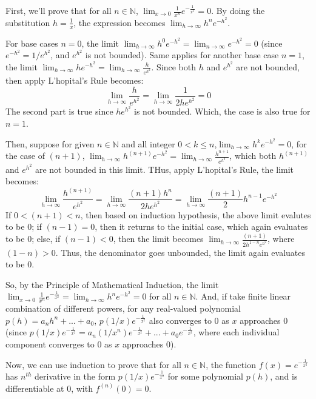 \documentclass{article}
\begin{document}
First, we'll prove that for all $n\in\mathbb{N}$, $\lim_{x\rightarrow 0}\frac{1}{x^n}e^{-\frac{1}{x^2}}=0$.
By doing the substitution $h=\frac{1}{x}$, the expression becomes $\lim_{h\rightarrow\infty}h^ne^{-h^2}$.

For base cases $n=0$, the limit $\lim_{h\rightarrow \infty}h^0e^{-h^2} = \lim_{n\rightarrow\infty}e^{-h^2}=0$ (since $e^{-h^2}=1/e^{h^2}$, and $e^{h^2}$ is not bounded).
Same applies for another base case $n=1$, the limit $\lim_{h\rightarrow\infty}he^{-h^2} = \lim_{h\rightarrow\infty}\frac{h}{e^{h^2}}$. Since both $h$ and $e^{h^2}$ are not bounded, 
then apply L'hopital's Rule becomes:
$$\lim_{h\rightarrow\infty}\frac{h}{e^{h^2}}=\lim_{h\rightarrow\infty}\frac{1}{2he^{h^2}}=0$$
The second part is true since $he^{h^2}$ is not bounded. Which, the case is also true for $n=1$.

\hfill

Then, suppose for given $n\in\mathbb{N}$ and all integer $0< k\leq n$,$\lim_{h\rightarrow\infty}h^ke^{-h^2}=0$, for the case of $(n+1)$,
$\lim_{h\rightarrow\infty}h^{(n+1)}e^{-h^2}=\lim_{h\rightarrow\infty}\frac{h^{n+1}}{e^{h^2}}$, which both $h^{(n+1)}$ and $e^{h^2}$ are not bounded in this limit. THus, apply L'hopital's Rule, the limit becomes:
$$\lim_{h\rightarrow\infty}\frac{h^{(n+1)}}{e^{h^2}}=\lim_{h\rightarrow\infty}\frac{(n+1)h^n}{2he^{h^2}}=\lim_{h\rightarrow\infty}\frac{(n+1)}{2}h^{n-1}e^{-h^2}$$
If $0<(n+1)<n$, then based on induction hypothesis, the above limit evalutes to be $0$; 
if $(n-1)=0$, then it returns to the initial case, which again evaluates to be $0$;
else, if $(n-1)<0$, then the limit becomes $\lim_{h\rightarrow\infty}\frac{(n+1)}{2h^{1-n}e^{h^2}}$, where $(1-n)>0$. Thus, the denominator goes unbounded, the limit again evaluates to be $0$.

So, by the Principle of Mathematical Induction, the limit $\lim_{x\rightarrow 0}\frac{1}{x^n}e^{-\frac{1}{x^2}}=\lim_{h\rightarrow\infty}h^ne^{-h^2}=0$ for all $n\in\mathbb{N}$.
And, if take finite linear combination of different powers, for any real-valued polynomial $p(h)=a_nh^n+...+a_0$, $p(1/x)e^{-\frac{1}{x^2}}$ also converges to $0$ as $x$ approaches $0$
(since $p(1/x)e^{-\frac{1}{x^2}}=a_n(1/x^n)e^{-\frac{1}{x^2}}+...+a_0e^{-\frac{1}{x^2}}$, where each individual component converges to $0$ as $x$ approaches $0$).

\hfill

\hfill

Now, we can use induction to prove that for all $n\in\mathbb{N}$,
the function $f(x)=e^{-\frac{1}{x^2}}$ has $n^{th}$ derivative in the form $p(1/x)e^{-\frac{1}{x^2}}$ for some polynomial $p(h)$, and is differentiable at $0$, with $f^{(n)}(0)=0$.
\end{document}
